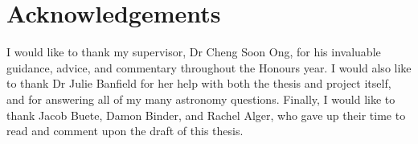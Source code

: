 
\chapter*{Acknowledgements}
\label{cha:ack}

    I would like to thank my supervisor, Dr Cheng Soon Ong, for his invaluable
    guidance, advice, and commentary throughout the Honours year. I would also
    like to thank Dr Julie Banfield for her help with both the thesis and
    project itself, and for answering all of my many astronomy questions.
    Finally, I would like to thank Jacob Buete, Damon Binder, and Rachel Alger,
    who gave up their time to read and comment upon the draft of this thesis.
